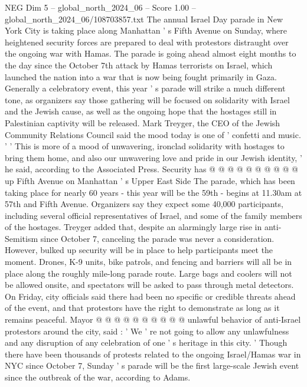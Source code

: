 \begin{textsample}{NEG Dim 5 – global\_north\_2024\_06 – Score 1.00 – global\_north\_2024\_06/108703857.txt}  \label{ex:f5_neg_136}
The annual Israel Day parade in New York City is taking place along Manhattan ' s Fifth Avenue on Sunday, where heightened security forces are prepared to deal with protestors distraught over the ongoing war with Hamas.
The parade is going ahead almost eight months to the day since the October 7th attack by Hamas terrorists on Israel, which launched the nation into a war that is now being fought primarily in Gaza.
Generally a celebratory event, this year ' s parade will strike a much different tone, as organizers say those gathering will be focused on solidarity with Israel and the Jewish cause, as well as the ongoing hope that the hostages still in Palestinian captivity will be released.
Mark Treyger, the CEO of the Jewish Community Relations Council said the mood today is one of ' confetti and music. ' ' This is more of a mood of unwavering, ironclad solidarity with hostages to bring them home, and also our unwavering love and pride in our Jewish identity, ' he said, according to the Associated Press.
Security has @ @ @ @ @ @ @ @ @ @ up Fifth Avenue on Manhattan ' s Upper East Side The parade, which has been taking place for nearly 60 years - this year will be the 59th - begins at 11.30am at 57th and Fifth Avenue.
Organizers say they expect some 40,000 participants, including several official representatives of Israel, and some of the family members of the hostages.
Treyger added that, despite an alarmingly large rise in anti-Semitism since October 7, canceling the parade was never a consideration.
However, bulked up security will be in place to help participants meet the moment.
Drones, K-9 units, bike patrols, and fencing and barriers will all be in place along the roughly mile-long parade route.
Large bags and coolers will not be allowed onsite, and spectators will be asked to pass through metal detectors.
On Friday, city officials said there had been no specific or credible threats ahead of the event, and that protestors have the right to demonstrate as long as it remains peaceful.
Mayor @ @ @ @ @ @ @ @ @ @ unlawful behavior of anti-Israel protestors around the city, said : ' We ' re not going to allow any unlawfulness and any disruption of any celebration of one ' s heritage in this city. ' Though there have been thousands of protests related to the ongoing Israel/Hamas war in NYC since October 7, Sunday ' s parade will be the first large-scale Jewish event since the outbreak of the war, according to Adams.

\end{textsample}
